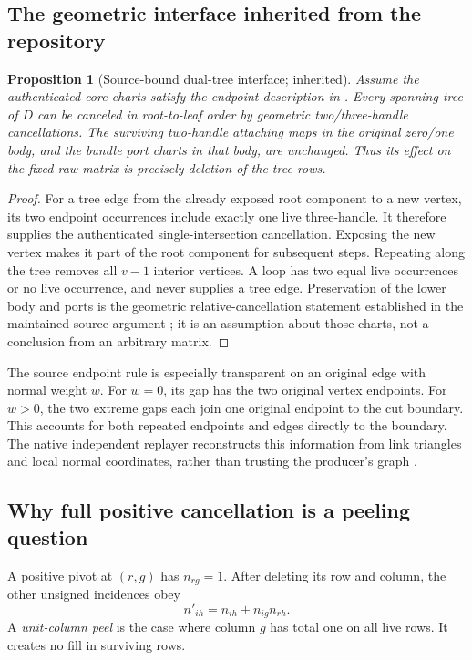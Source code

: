 \documentclass[11pt,letterpaper]{article}
\newtheorem{proposition}[theorem]{Proposition}
\theoremstyle{definition}
\theoremstyle{remark}
\begin{document}
\subsection{The geometric interface inherited from the repository}
\begin{proposition}[Source-bound dual-tree interface; inherited]\label{prop:geometry}
Assume the authenticated core charts satisfy the endpoint description in
\cite{repo-dual}. Every spanning tree of $D$ can be canceled in root-to-leaf order
by geometric two/three-handle cancellations. The surviving two-handle attaching
maps in the original zero/one body, and the bundle port charts in that body, are
unchanged. Thus its effect on the fixed raw matrix is precisely deletion of the
tree rows.
\end{proposition}
\begin{proof}
For a tree edge from the already exposed root component to a new vertex, its two
endpoint occurrences include exactly one live three-handle. It therefore supplies
the authenticated single-intersection cancellation. Exposing the new vertex makes
it part of the root component for subsequent steps. Repeating along the tree
removes all $v-1$ interior vertices. A loop has two equal live occurrences or no
live occurrence, and never supplies a tree edge. Preservation of the lower body
and ports is the geometric relative-cancellation statement established in the
maintained source argument \cite{repo-dual}; it is an assumption about those
charts, not a conclusion from an arbitrary matrix.
\end{proof}

The source endpoint rule is especially transparent on an original edge with
normal weight $w$. For $w=0$, its gap has the two original vertex endpoints. For
$w>0$, the two extreme gaps each join one original endpoint to the cut boundary.
This accounts for both repeated endpoints and edges directly to the boundary.
The native independent replayer reconstructs this information from link triangles
and local normal coordinates, rather than trusting the producer's graph
\cite{repo-checker}.

\subsection{Why full positive cancellation is a peeling question}
A positive pivot at $(r,g)$ has $n_{rg}=1$. After deleting its row and column, the
other unsigned incidences obey
\begin{equation}\label{eq:positive-update}
 n'_{ih}=n_{ih}+n_{ig}n_{rh}.
\end{equation}
A \emph{unit-column peel} is the case where column $g$ has total one on all live
rows. It creates no fill in surviving rows.
\end{document}
